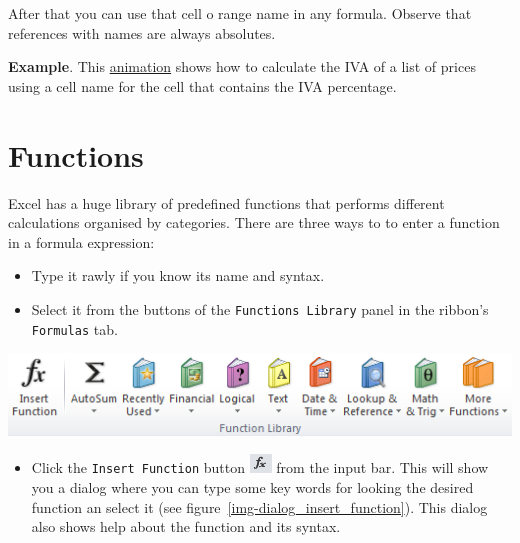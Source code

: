 After that you can use that cell o range name in any formula. Observe that references with names are always absolutes.

\textbf{Example}. This \href{http://aprendeconalf.es/office/excel/manual/img/example_formulas_with_defined_names.gif}{animation} shows how to calculate the IVA of a list of prices using a cell name for the cell that contains the IVA percentage.

\section{Functions}\label{functions}

Excel has a huge library of predefined functions that performs different calculations organised by categories. There are three ways to to enter a function in a formula expression:

\begin{itemize}
\item Type it rawly if you know its name and syntax.
\item Select it from the buttons of the \texttt{Functions Library} panel in the ribbon's \texttt{Formulas} tab.
\end{itemize}

\begin{center}
\includegraphics[scale=0.7]{../img/panel_formulas.png}
\end{center}

\begin{itemize}
\item Click the \texttt{Insert Function} button \includegraphics[scale=0.7]{../img/button_insert_function.png} from the
input bar.
This will show you a dialog where you can type some key words for looking the desired function an select it (see
figure~\ref{img-dialog_insert_function}).
This dialog also shows help about the function and its syntax.
\end{itemize}

